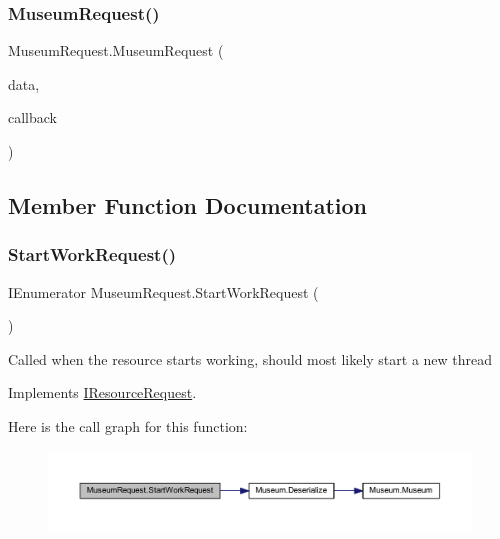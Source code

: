 \subsubsection{\texorpdfstring{Museum\+Request()}{MuseumRequest()}}
{\footnotesize\ttfamily Museum\+Request.\+Museum\+Request (\begin{DoxyParamCaption}\item[{\mbox{\hyperlink{class_museum_request_data}{Museum\+Request\+Data}}}]{data,  }\item[{Action$<$ \mbox{\hyperlink{class_museum}{Museum}} $>$}]{callback }\end{DoxyParamCaption})}



\subsection{Member Function Documentation}
\mbox{\label{class_museum_request_a41b1a4699551a86415a877d5380febe1}} 
\subsubsection{\texorpdfstring{Start\+Work\+Request()}{StartWorkRequest()}}
{\footnotesize\ttfamily I\+Enumerator Museum\+Request.\+Start\+Work\+Request (\begin{DoxyParamCaption}{ }\end{DoxyParamCaption})}



Called when the resource starts working, should most likely start a new thread 



Implements \mbox{\hyperlink{interface_i_resource_request_a5b40a09cb820283600ac9e3f846936f9}{I\+Resource\+Request}}.

Here is the call graph for this function\+:
\nopagebreak
\begin{figure}[H]
\begin{center}
\leavevmode
\includegraphics[width=350pt]{class_museum_request_a41b1a4699551a86415a877d5380febe1_cgraph}
\end{center}
\end{figure}
\mbox{\label{class_museum_request_af34f7bf3bc637d500983a44272577a2e}} 
